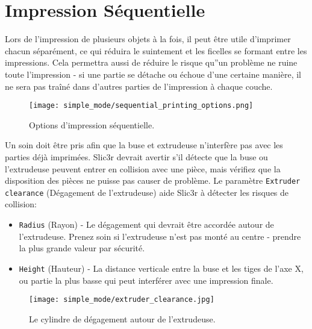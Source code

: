
\section{Impression S\'equentielle} %
\label{sec:sequential_printing}

Lors de l'impression de plusieurs objets \`a la fois, il peut \^etre utile d'imprimer chacun s\'epar\'ement, ce qui r\'eduira le suintement et les ficelles se formant entre les impressions. Cela permettra aussi de r\'eduire le risque qu''un probl\`eme ne ruine toute l'impression - si une partie se d\'etache ou \'echoue d'une certaine mani\`ere, il ne sera pas tra\^in\'e dans d'autres parties de l'impression \`a chaque couche.

\begin{figure}[H]
\centering
\texttt{[image: simple\_mode/sequential\_printing\_options.png]}
\caption{Options d'impression s\'equentielle.}
\label{fig:sequential_printing_options}
\end{figure}

Un soin doit \^etre pris afin que la buse et extrudeuse n'interf\`ere pas avec les parties d\'ej\`a imprim\'ees.  Slic3r devrait avertir s'il d\'etecte que la buse ou l'extrudeuse peuvent entrer en collision avec une pi\`ece, mais v\'erifiez que la disposition des pi\`eces ne puisse pas causer de probl\`eme.  Le param\`etre \texttt{Extruder clearance} (D\'egagement de l'extrudeuse) aide Slic3r \`a d\'etecter les risques de collision:
\begin{itemize}
	\item \texttt{Radius} (Rayon) - Le d\'egagement qui devrait \^etre accord\'ee autour de l'extrudeuse. Prenez soin si l'extrudeuse n'est pas mont\'e au centre - prendre la plus grande valeur par s\'ecurit\'e.
	\item \texttt{Height} (Hauteur) - La distance verticale entre la buse et les tiges de l'axe X, ou partie la plus basse qui peut interf\'erer avec une impression finale.
\end{itemize}

\begin{figure}[H]
\centering
\texttt{[image: simple\_mode/extruder\_clearance.jpg]}
\caption{Le cylindre de d\'egagement autour de l'extrudeuse.}
\label{fig:a_diagram_depicting_extruder_clearance}
\end{figure}

